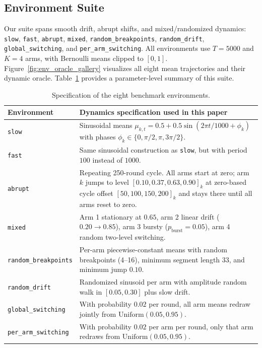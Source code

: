 \documentclass{article}
\begin{document}
\subsection{Environment Suite}
Our suite spans smooth drift, abrupt shifts, and mixed/randomized dynamics:
\texttt{slow}, \texttt{fast}, \texttt{abrupt}, \texttt{mixed}, \texttt{random\_breakpoints}, \texttt{random\_drift}, \texttt{global\_switching}, and \texttt{per\_arm\_switching}.
All environments use $T=5000$ and $K=4$ arms, with Bernoulli means clipped to $[0,1]$.
Figure~\ref{fig:env_oracle_gallery} visualizes all eight mean trajectories and their dynamic oracle.
Table~\ref{tab:env_suite_summary} provides a parameter-level summary of this suite.
\begin{table}[H]
\centering
\small
\setlength{\tabcolsep}{4pt}
\begin{tabularx}{\linewidth}{lX}
\toprule
Environment & Dynamics specification used in this paper \\
\midrule
\texttt{slow} & Sinusoidal means $\mu_{k,t}=0.5+0.5\sin(2\pi t/1000+\phi_k)$ with phases $\phi_k\in\{0,\pi/2,\pi,3\pi/2\}$. \\
\texttt{fast} & Same sinusoidal construction as \texttt{slow}, but with period $100$ instead of $1000$. \\
\texttt{abrupt} & Repeating 250-round cycle. All arms start at zero; arm $k$ jumps to level $[0.10,0.37,0.63,0.90]_k$ at zero-based cycle offset $[50,100,150,200]_k$ and stays there until all arms reset to zero. \\
\texttt{mixed} & Arm 1 stationary at $0.65$, arm 2 linear drift ($0.20\rightarrow0.85$), arm 3 bursty ($p_{\text{burst}}=0.05$), arm 4 random two-level switching. \\
\texttt{random\_breakpoints} & Per-arm piecewise-constant means with random breakpoints (4--16), minimum segment length $33$, and minimum jump $0.10$. \\
\texttt{random\_drift} & Randomized sinusoid per arm with amplitude random walk in $[0.05,0.30]$ plus slow drift. \\
\texttt{global\_switching} & With probability $0.02$ per round, all arm means redraw jointly from $\mathrm{Uniform}(0.05,0.95)$. \\
\texttt{per\_arm\_switching} & With probability $0.02$ per arm per round, only that arm redraws from $\mathrm{Uniform}(0.05,0.95)$. \\
\bottomrule
\end{tabularx}
\caption{Specification of the eight benchmark environments.}
\label{tab:env_suite_summary}
\end{table}
\end{document}
